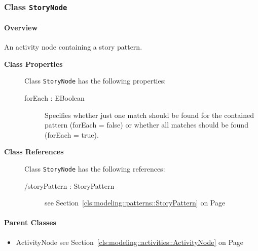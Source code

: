 \subsubsection{\Large{Class \bfseries \texttt{StoryNode}\normalfont}}
\label{cls:modeling::activities::StoryNode} 
\paragraph{Overview}

	
			
An activity node containing a story pattern.	
		
	


\begin{description}

	\item[\textbf{Class Properties}] Class \texttt{StoryNode} has the following properties:
	\begin{description}
\item[forEach : EBoolean 	]
\hspace{\fill}
\nopagebreak


	
			
Specifies whether just one match should be found for the contained pattern (forEach  = false) or whether all matches should be found (forEach = true).	
		
	
	\end{description}
	
	\item[\textbf{Class References}] Class \texttt{StoryNode} has the following references:
	\begin{description}
\item[/storyPattern : StoryPattern 	]
see Section~\ref{cls:modeling::patterns::StoryPattern} on Page~\pageref{cls:modeling::patterns::StoryPattern}\hspace{\fill}
\nopagebreak


	
			
	
		
	
	\end{description}
	

\end{description}

\paragraph{Parent Classes}
\begin{itemize}
\item ActivityNode see Section~\ref{cls:modeling::activities::ActivityNode} on Page~\pageref{cls:modeling::activities::ActivityNode}\end{itemize}
